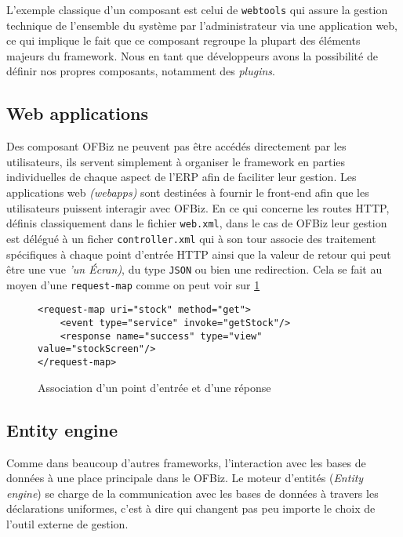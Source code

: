 L'exemple classique d'un composant est celui de \verb|webtools| qui assure la gestion technique de l'ensemble du système par l'administrateur via une application web, ce qui implique le fait que ce composant regroupe la plupart des éléments majeurs du framework.
Nous en tant que développeurs avons la possibilité de définir nos propres composants, notamment des \emph{plugins}. 
  


\subsection{Web applications}
Des composant OFBiz ne peuvent pas être accédés directement par les utilisateurs, ils servent simplement à organiser le framework en parties individuelles de chaque aspect de l'ERP afin de faciliter leur gestion. Les applications web \emph{(webapps)} sont destinées à fournir le front-end afin que les utilisateurs puissent interagir avec OFBiz. En ce qui concerne les routes HTTP, définis classiquement dans le fichier \verb|web.xml|, dans le cas de OFBiz leur gestion est délégué à un ficher \verb|controller.xml| qui à son tour associe des traitement spécifiques à chaque point d'entrée HTTP ainsi que la valeur de retour qui peut être une vue \emph{'un Écran)}, du type \verb|JSON| ou bien une redirection. Cela se fait au moyen d'une \verb|request-map| comme on peut voir sur \ref{reqmap}



\lstset{language=XML}
\begin{figure}
\begin{lstlisting}
<request-map uri="stock" method="get">
    <event type="service" invoke="getStock"/>
    <response name="success" type="view" value="stockScreen"/>
</request-map>
\end{lstlisting}
	\caption{Association d'un point d'entrée et d'une réponse}
\label{reqmap}
\end{figure}



\subsection{Entity engine}
Comme dans beaucoup d'autres frameworks, l'interaction avec les bases de données à une place principale dans le OFBiz. Le moteur d'entités (\emph{Entity engine}) se charge de la communication avec les  bases de données à travers les déclarations uniformes, c'est à dire qui changent pas peu importe le choix de l'outil externe de gestion.



